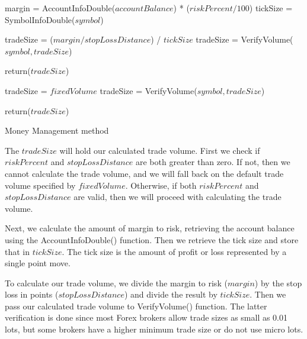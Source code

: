 \vspace{\baselineskip}%
\begin{algorithm}[H]
{
margin = AccountInfoDouble($accountBalance$) * ($riskPercent/100$)\;
tickSize = SymbolInfoDouble($symbol$)\;

tradeSize = ($margin / stopLossDistance$) / $tickSize$\;
tradeSize = VerifyVolume($symbol,tradeSize$)\;

return($tradeSize$)\;
}{
tradeSize = $fixedVolume$\;
tradeSize = VerifyVolume($symbol,tradeSize$)\;
		
return($tradeSize$)\;
}

\caption{Money Management method}
\label{alg:mm}
\end{algorithm}

\vspace{\baselineskip}%
The $tradeSize$ will hold our calculated trade volume. First we check if $riskPercent$  and $stopLossDistance$ are both greater than zero. If not, then we cannot calculate the trade volume, and we will fall back on the default trade volume specified by $fixedVolume$. Otherwise, if both $riskPercent$  and $stopLossDistance$ are valid, then we will proceed with calculating the trade volume.

Next, we calculate the amount of margin to risk, retrieving the account balance using the AccountInfoDouble() function. Then we retrieve the tick size and store that in $tickSize$. The tick size is the amount of profit or loss represented by a single point move. 

To calculate our trade volume, we divide the margin to risk ($margin$) by the stop loss in points ($stopLossDistance$) and divide the result by $tickSize$. Then we pass our calculated trade volume to VerifyVolume() function. The latter verification is done since most Forex brokers allow trade sizes as small as 0.01 lots, but some brokers have a higher minimum trade size or do not use micro lots.

